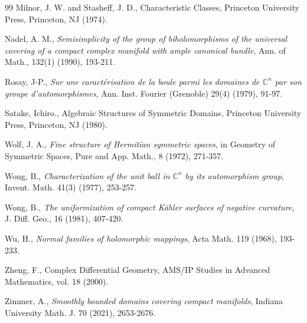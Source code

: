 \documentclass[12pt]{article}
\newcommand{\C}{\mathbb{C}}
\begin{document}
\begin{thebibliography}{99}
 Milnor, J. W. and Stasheff, J. D., Characteristic Classes, Princeton University Press, Princeton, NJ (1974).

 Nadel, A. M., \textit{Semisimplicity of the group of biholomorphisms of the universal covering of a compact complex manifold with ample canonical bundle}, Ann. of Math., 132(1) (1990), 193-211. 

 Rosay, J-P., \textit{Sur une caract\'erisation de la boule parmi les domaines de $\C^n$ par son groupe d'automorphismes}, Ann. Inst. Fourier (Grenoble) 29(4) (1979), 91-97.

 Satake, Ichiro., Algebraic Structures of Symmetric Domains, Princeton University Press, Princeton, NJ (1980).

 Wolf, J. A., \textit{Fine structure of Hermitian symmetric spaces}, in Geometry of Symmetric Spaces, Pure and App. Math., 8 (1972), 271-357.

 Wong, B., \textit{Characterization of the unit ball in $\C^n$ by its automorphism group}, Invent. Math. 41(3) (1977), 253-257. 

 Wong, B., \textit{The uniformization of compact K\"ahler surfaces of negative curvature}, J. Diff. Geo., 16 (1981), 407-420.

 Wu, H., \textit{Normal families of holomorphic mappings}, Acta Math. 119 (1968), 193-233.

 Zheng, F., Complex Differential Geometry, AMS/IP Studies in Advanced Mathematics, vol. 18 (2000).

 Zimmer, A., \textit{Smoothly bounded domains covering compact manifolds}, Indiana University Math. J. 70 (2021), 2653-2676.

\end{thebibliography}
\end{document}
